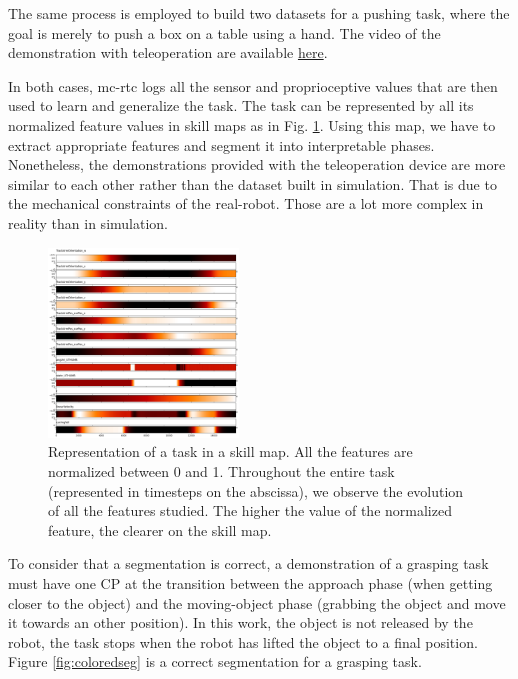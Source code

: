 \documentclass[conference]{IEEEtran}
\begin{document}
 The same process is employed to build two datasets for a pushing task, where the goal is merely to push a box on a table using a hand. The video of the demonstration with teleoperation are available \href{https://github.com/VictorBbt/Article_TaskGeneralization}{here}.

 In both cases, mc-rtc logs all the sensor and proprioceptive values that are then used to learn and generalize the task. The task can be represented by all its normalized feature values in skill maps as in Fig. \ref{fig:skillmap}. Using this map, we have to extract appropriate features and segment it into interpretable phases. Nonetheless, the demonstrations provided with the teleoperation device are more similar to each other rather than the dataset built in simulation. That is due to the mechanical constraints of the real-robot. Those are a lot more complex in reality than in simulation.

 \begin{figure}[ht]
  \centering
  \includegraphics[width=0.45\textwidth]{img/skillMap.png}
  \caption{Representation of a task in a skill map. All the features are normalized between 0 and 1. Throughout the entire task (represented in timesteps on the abscissa), we observe the evolution of all the features studied. The higher the value of the normalized feature, the clearer on the skill map.}
  \label{fig:skillmap}
\end{figure}

To consider that a segmentation is correct, a demonstration of a grasping task must have one CP at the transition between the approach phase (when getting closer to the object) and the moving-object phase (grabbing the object and move it towards an other position). In this work, the object is not released by the robot, the task stops when the robot has lifted the object to a final position. Figure \ref{fig:coloredseg} is a correct segmentation for a grasping task.
\end{document}
